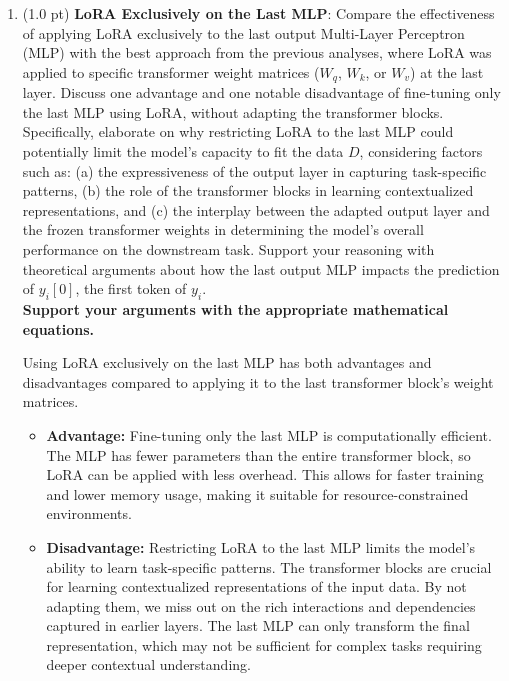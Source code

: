 \begin{enumerate}
\begin{enumerate}
\item (1.0 pt) \textbf{LoRA Exclusively on the Last MLP}: Compare the effectiveness of applying LoRA exclusively to the last output Multi-Layer Perceptron (MLP) with the best approach from the previous analyses, where LoRA was applied to specific transformer weight matrices ($W_q$, $W_k$, or $W_v$) at the last layer. Discuss one advantage and one notable disadvantage of fine-tuning only the last MLP using LoRA, without adapting the transformer blocks. Specifically, elaborate on why restricting LoRA to the last MLP could potentially limit the model's capacity to fit the data $D$, considering factors such as: (a) the expressiveness of the output layer in capturing task-specific patterns, (b) the role of the transformer blocks in learning contextualized representations, and (c) the interplay between the adapted output layer and the frozen transformer weights in determining the model's overall performance on the downstream task. Support your reasoning with theoretical arguments about how the last output MLP impacts the prediction of $y_i[0]$, the first token of $y_i$.\\
{\bf Support your arguments with the appropriate mathematical equations.}

\begin{answerbox}[5in]
    Using LoRA exclusively on the last MLP has both advantages and disadvantages compared to applying it to the last transformer block's weight matrices.
\begin{itemize}
    \item \textbf{Advantage:} Fine-tuning only the last MLP is computationally efficient. The MLP has fewer parameters than the entire transformer block, so LoRA can be applied with less overhead. This allows for faster training and lower memory usage, making it suitable for resource-constrained environments.

    \item \textbf{Disadvantage:} Restricting LoRA to the last MLP limits the model's ability to learn task-specific patterns. The transformer blocks are crucial for learning contextualized representations of the input data. By not adapting them, we miss out on the rich interactions and dependencies captured in earlier layers. The last MLP can only transform the final representation, which may not be sufficient for complex tasks requiring deeper contextual understanding.


\end{itemize}
\end{answerbox}
\end{enumerate}
\end{enumerate}
